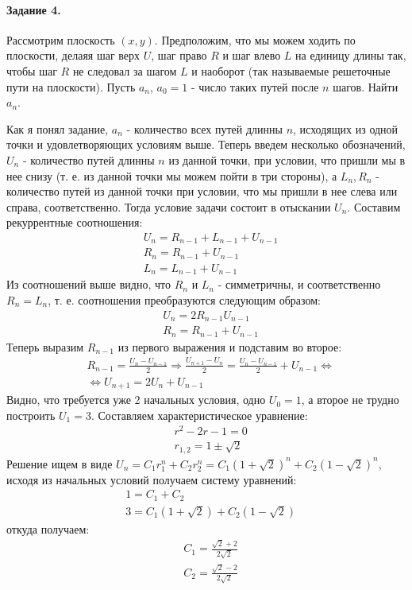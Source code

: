 \documentclass[a4paper,12pt]{article}
\begin{document}
\paragraph{Задание 4.} Рассмотрим плоскость $\left(x,y\right)$. Предположим, что мы можем ходить по плоскости, делаяя шаг верх $U$, шаг право $R$ и шаг влево $L$ на единицу длины так, чтобы шаг $R$ не следовал за шагом $L$ и наоборот (так называемые решеточные пути на плоскости). Пусть $a_n$, $a_0=1$ - число таких путей после $n$ шагов. Найти $a_n$.

\begin{Solution}
Как я понял задание, $a_n$ - количество всех путей длинны $n$, исходящих из одной точки и удовлетворяющих условиям выше. Теперь введем несколько обозначений, $U_n$ - количество путей длинны $n$ из данной точки, при условии, что пришли мы в нее снизу (т. е. из данной точки мы можем пойти в три стороны), а $L_n,R_n$ - количество путей из данной точки при условии, что мы пришли в нее слева или справа, соответственно. Тогда условие задачи состоит в отыскании $U_n$. Составим рекуррентные соотношения:
\[
	\begin{split}
		& U_n = R_{n-1} + L_{n-1} + U_{n-1} \\
		& R_n = R_{n-1} + U_{n-1} \\
		& L_n = L_{n-1} + U_{n-1}
	\end{split}
\]
Из соотношений выше видно, что $R_n$ и $L_n$ - симметричны, и соответственно $R_n = L_n$, т. е. соотношения преобразуются следующим образом:
\[
	\begin{split}
		& U_n = 2 R_{n-1} U_{n-1} \\
		& R_n = R_{n-1} + U_{n-1}
	\end{split}
\]
Теперь выразим $R_{n-1}$ из первого выражения и подставим во второе:
\[
	\begin{split}
		& R_{n-1} = \frac{U_n - U_{n-1}}{2} \Rightarrow \frac{U_{n+1} - U_n}{2} = \frac{U_n - U_{n-1}}{2} + U_{n-1} \Leftrightarrow \\
		& \Leftrightarrow U_{n+1} = 2 U_n + U_{n-1}
	\end{split}
\]
Видно, что требуется уже 2 начальных условия, одно $U_0 = 1$, а второе не трудно построить $U_1 = 3$.
Составляем характеристическое уравнение:
\[
	\begin{split}
		& r^2 - 2 r - 1 = 0 \\
		& r_{1,2} = 1 \pm \sqrt{2}
	\end{split}
\]
Решение ищем в виде $U_n = C_1 r_1^n + C_2 r_2^n = C_1 {\left(1+\sqrt{2}\right)}^n + C_2 {\left(1 - \sqrt{2}\right)}^n$, исходя из начальных условий получаем систему уравнений:
\[
	\begin{split}
		& 1 = C_1 + C_2 \\
		& 3 = C_1 \left(1 + \sqrt{2}\right) + C_2 \left(1 - \sqrt{2}\right)
	\end{split}
\]
откуда получаем:
\[
	\begin{split}
		& C_1 = \frac{\sqrt{2} + 2}{2\sqrt{2}} \\
		& C_2 = \frac{\sqrt{2} - 2}{2 \sqrt{2}}
	\end{split}
\]
\end{Solution}
\end{document}
